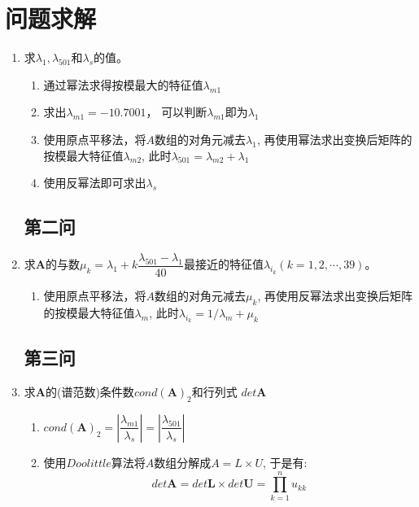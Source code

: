 \section{问题求解}
\begin{enumerate}
\subsection{第一问}

\item 求$\lambda _1,\lambda _{501}$和$\lambda_s$的值。

\begin{enumerate}

\item	通过幂法求得按模最大的特征值$\lambda_{m1}$

\item 求出$\lambda_{m1}=-10.7001$，
可以判断$\lambda_{m1}$即为$\lambda_1$

\item 使用原点平移法，将$A$数组的对角元减去$\lambda_1$,
再使用幂法求出变换后矩阵的按模最大特征值$\lambda_{m2}$,
此时$\lambda_{501}=\lambda_{m2}+\lambda_1$

\item 使用反幂法即可求出$\lambda_s$
\end{enumerate}

\subsection{第二问}
\item 求$\bm{A}$的与数${\mu _{k}} = {\lambda _1} + k\dfrac{{{\lambda _{501}} - {\lambda _1}}}{{40}}$最接近的特征值${\lambda _{{i_k}}}(k=1,2,\cdots,39)$。
\begin{enumerate}
\item 使用原点平移法，将$A$数组的对角元减去$\mu_k$,
再使用反幂法求出变换后矩阵的按模最大特征值$\lambda_{m}$,
此时$\lambda_{i_k}=1/\lambda_{m}+\mu_k$
\end{enumerate}
\subsection{第三问}
\item 求$\bm{A}$的(谱范数)条件数$cond(\bm{A})_2$和行列式
$det\bm{A}$

\begin{enumerate}
\item $cond(\bm{A})_2=\left|\dfrac{\lambda_{m1}}{\lambda_{s}}\right|=\left|\dfrac{\lambda_{501}}{\lambda_{s}}\right|$

\item 使用$Doolittle$算法将$A$数组分解成$A=L\times U$,
于是有:
\[det\bm{A}=det\bm{L}\times det\bm{U}=\prod\limits_{k = 1}^n {{u_{kk}}} \]

\end{enumerate}
\end{enumerate}

